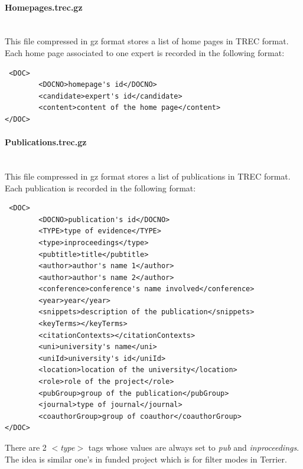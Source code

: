 \paragraph{Homepages.trec.gz} \hspace{0pt} \\
This file compressed in gz format stores a list of home pages in TREC format. Each home page associated to one expert is recorded in the following format:
\begin{verbatim}
 <DOC>
        <DOCNO>homepage's id</DOCNO>
        <candidate>expert's id</candidate>
        <content>content of the home page</content>
</DOC>
\end{verbatim}

\paragraph{Publications.trec.gz} \hspace{0pt} \\
This file compressed in gz format stores a list of publications in TREC format. Each publication is recorded in the following format:
\begin{verbatim}
 <DOC>
        <DOCNO>publication's id</DOCNO>
        <TYPE>type of evidence</TYPE>
        <type>inproceedings</type>
        <pubtitle>title</pubtitle>
        <author>author's name 1</author>
        <author>author's name 2</author>
        <conference>conference's name involved</conference>
        <year>year</year>
        <snippets>description of the publication</snippets>
        <keyTerms></keyTerms>
        <citationContexts></citationContexts>
        <uni>university's name</uni>
        <uniId>university's id</uniId>
        <location>location of the university</location>
        <role>role of the project</role>
        <pubGroup>group of the publication</pubGroup>
        <journal>type of journal</journal>
        <coauthorGroup>group of coauthor</coauthorGroup>
</DOC>
\end{verbatim}
There are 2 \textit{$<$type$>$} tags whose values are always set to \textit{pub} and \textit{inproceedings}. The idea is similar one's in 
funded project which is for filter modes in Terrier.

